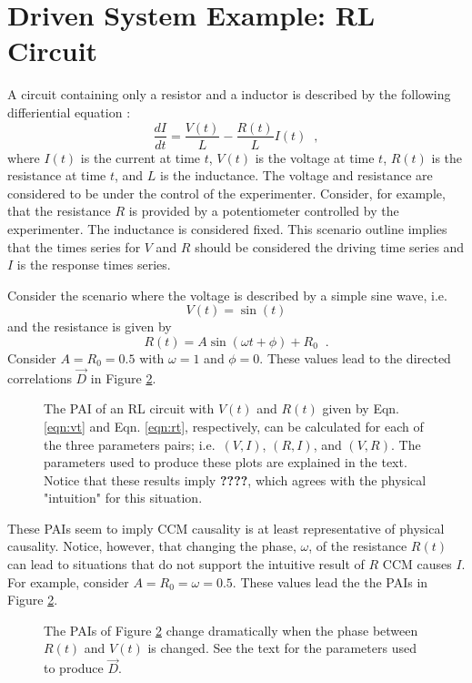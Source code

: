 \documentclass[a4paper,11pt]{article}
\begin{document}
\section{Driven System Example: RL Circuit}
A circuit containing only a resistor and a inductor is described by the following differiential equation \cite{halliday2013}:
\begin{equation}
\label{eqn:it}
\frac{dI}{dt} = \frac{V(t)}{L} - \frac{R(t)}{L} I(t)\;\;,
\end{equation}
where $I(t)$ is the current at time $t$, $V(t)$ is the voltage at time $t$, $R(t)$ is the resistance at time $t$, and $L$ is the inductance.  The voltage and resistance are considered to be under the control of the experimenter.  Consider, for example, that the resistance $R$ is provided by a potentiometer controlled by the experimenter.  The inductance is considered fixed.  This scenario outline implies that the times series for $V$ and $R$ should be considered the driving time series and $I$ is the response times series.  

Consider the scenario where the voltage is described by a simple sine wave, i.e.\
\begin{equation}
\label{eqn:vt}
V(t) = \sin(t)
\end{equation}
and the resistance is given by
\begin{equation}
\label{eqn:rt}
R(t) = A\sin(\omega t + \phi) + R_0\;\;.
\end{equation}
Consider $A=R_0=0.5$ with $\omega=1$ and $\phi=0$.  These values lead to the directed correlations $\vec{D}$ in Figure \ref{fig:}.  
\begin{figure}[ht]
\label{fig:}
\caption{The PAI of an RL circuit with $V(t)$ and $R(t)$ given by Eqn. \ref{eqn:vt} and Eqn. \ref{eqn:rt}, respectively, can be calculated for each of the three parameters pairs; i.e.\ $(V,I)$, $(R,I)$, and $(V,R)$.  The parameters used to produce these plots are explained in the text.  Notice that these results imply {\bf ????}, which agrees with the physical "intuition" for this situation.}
\end{figure}
These PAIs seem to imply CCM causality is at least representative of physical causality.  Notice, however, that changing the phase, $\omega$, of the resistance $R(t)$ can lead to situations that do not support the intuitive result of $R$ CCM causes $I$.  For example, consider $A=R_0=\omega=0.5$.  These values lead the the PAIs in Figure \ref{fig:}.
\begin{figure}[ht]
\label{fig:}
\caption{The PAIs of Figure \ref{fig:} change dramatically when the phase between $R(t)$ and $V(t)$ is changed.  See the text for the parameters used to produce $\vec{D}$.}
\end{figure}
\end{document}
